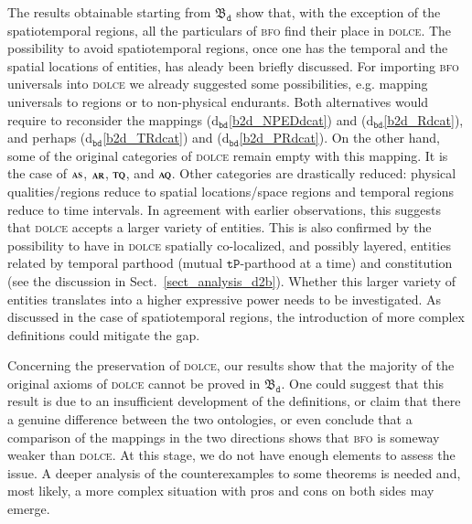 \documentclass[ao]{iosart2x}
\newcommand{\nb}[1]{\textcolor{red}{$|$}\marginpar{\hspace*{-0cm}\parbox{20mm}{\scriptsize\raggedright\textcolor{red}{#1}}}}
\newcommand{\bdDefLabel}{\textrm{d$_\texttt{bd}$}}
\newcommand{\refbddf}[1]{({\bdDefLabel}\ref{#1})}
\newcommand{\pr}[1]{\mathtt{#1}}
\newcommand{\dolce}{{\textsc{dolce}}}
\newcommand{\bfo}{{\textsc{bfo}}}
\newcommand {\thbfobdmap} {\ensuremath{\mathfrak{B}_\texttt{d}}}
\newcommand {\AQdcat} {\textsc{aq}}
\newcommand {\ARdcat} {\textsc{ar}}
\newcommand {\ASdcat} {\textsc{as}}
\newcommand {\TQdcat} {\textsc{tq}}
\newcommand {\TPd} {\ensuremath{\pr{tP}}}
\begin{document}
The results obtainable starting from $\thbfobdmap$ %
show that, with the exception of the spatiotemporal regions, all the particulars of {\bfo} find their place in {\dolce}. The possibility to avoid spatiotemporal regions, once one has the temporal and the spatial locations of entities, has aleady been briefly discussed. %
For importing {\bfo} universals into {\dolce} we already suggested some possibilities, e.g. mapping universals to regions or to non-physical endurants. Both alternatives would require to reconsider the mappings \refbddf{b2d_NPEDdcat} and  \refbddf{b2d_Rdcat}, and perhaps \refbddf{b2d_TRdcat} and \refbddf{b2d_PRdcat}. On the other hand, some of the original categories of {\dolce} remain empty with this mapping. It is the case of $\ASdcat$, $\ARdcat$, $\TQdcat$, and $\AQdcat$. Other categories are drastically reduced: physical qualities/regions reduce to spatial locations/space regions and temporal regions reduce to time intervals. In agreement with earlier observations, this suggests that {\dolce} accepts a larger variety of entities. This is also confirmed by the possibility to have in {\dolce} spatially co-localized, and possibly layered, entities related by temporal parthood (mutual $\TPd$-parthood at a time) and constitution (see the discussion in Sect.~\ref{sect_analysis_d2b}). Whether this larger variety of entities translates into a higher expressive power needs to be investigated. As discussed in the case of spatiotemporal regions, the introduction of more complex definitions could mitigate the gap.

Concerning the preservation of {\dolce}, our results show that the majority of the original axioms of {\dolce}  cannot be proved in $\thbfobdmap$. One could suggest that this result is due to an insufficient development of the definitions, or claim that there a genuine difference between the two ontologies, or even conclude that a comparison of the mappings in the two directions shows that {\bfo} is someway weaker than {\dolce}. At this stage, we do not have enough elements to assess the issue. A deeper analysis of the counterexamples to some theorems is needed and, most likely, a more complex situation with pros and cons on both sides may emerge.  
\end{document}
